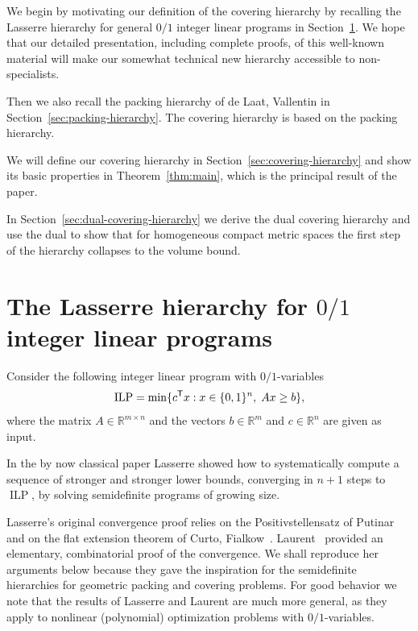 \documentclass{amsart}
\newcommand{\R}{\mathbb{R}}
\DeclareMathOperator{\ILP}{ILP}
\begin{document}
We begin by motivating our definition of the covering hierarchy by
recalling the Lasserre hierarchy for general $0/1$ integer linear
programs in Section~\ref{sec:Lasserre-hierarchy}. We
hope that our detailed presentation, including complete proofs, of this well-known material will make our 
somewhat technical new hierarchy accessible to non-specialists.

Then we also recall
the packing hierarchy of de Laat, Vallentin
\cite{de-Laat-Vallentin-2015} in
Section~\ref{sec:packing-hierarchy}. The covering hierarchy is based
on the packing hierarchy.

We will define our covering hierarchy in
Section~\ref{sec:covering-hierarchy} and show its basic properties in
Theorem~\ref{thm:main}, which is the principal result of the paper.

In Section~\ref{sec:dual-covering-hierarchy} we derive the dual covering
hierarchy and use the dual to show that for homogeneous compact metric
spaces the first step of the hierarchy collapses to the volume bound.

%
%
%

\section{The Lasserre hierarchy for $0/1$ integer linear programs}
\label{sec:Lasserre-hierarchy}

Consider the following integer linear program with $0/1$-variables
\[
\ILP =  \min\{c^{\sf T} x : x \in \{0,1\}^n, \; Ax \geq b\},
\]
where the matrix $A \in \R^{m \times n}$ and the vectors $b \in \R^m$
and $c \in \R^n$ are given as input.

In the by now classical paper \cite{Lasserre-2002} Lasserre showed how
to systematically compute a sequence of stronger and stronger lower
bounds, converging in $n+1$ steps to $\ILP$, by solving semidefinite
programs of growing size.

Lasserre's original convergence proof relies on the Positivstellensatz
of Putinar~\cite{Putinar-1993} and on the flat extension theorem of
Curto, Fialkow~\cite{Curto-Fialkow-2000}. Laurent~\cite{Laurent-2003}
provided an elementary, combinatorial proof of the convergence. We
shall reproduce her arguments below because they gave the inspiration
for the semidefinite hierarchies for geometric packing and covering
problems. For good behavior we note that the results of Lasserre and
Laurent are much more general, as they apply to nonlinear (polynomial)
optimization problems with $0/1$-variables.
\end{document}
